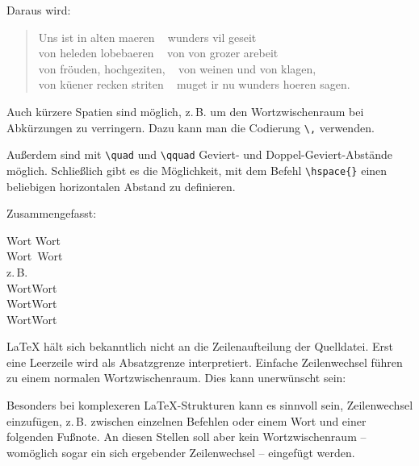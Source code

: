 Daraus wird:

\begin{lfgwprint}{}
 \begin{verse}
 Uns ist in alten maeren ~ wunders vil geseit\\
 von heleden lobebaeren ~ von von grozer arebeit\\
 von fröuden, hochgeziten, ~ von weinen und von klagen,\\
 von küener recken striten ~ muget ir nu wunders hoeren sagen.
 \end{verse}
\end{lfgwprint}

Auch kürzere Spatien sind möglich, z.\,B. um den Wortzwischenraum bei Abkürzungen zu verringern.
Dazu kann man die Codierung \lstinline/\,/ verwenden.

Außerdem sind mit \lstinline/\quad/ und \lstinline/\qquad/ Geviert- und Doppel-Geviert-Abstände
möglich.
Schließlich gibt es die Möglichkeit, mit dem Befehl \lstinline/\hspace{}/ einen beliebigen
horizontalen Abstand zu definieren.

Zusammengefasst:

\begin{lfgwexample}{}
Wort Wort\\       %
Wort~Wort\\       %
z.\,B.\\          %
Wort\quad Wort\\  %
Wort\qquad Wort\\ %
Wort\hspace{20mm}Wort\\ %
\end{lfgwexample}    



\LaTeX{} hält sich bekanntlich nicht an die Zeilenaufteilung der Quelldatei. Erst eine Leerzeile
wird als Absatzgrenze interpretiert. Einfache Zeilenwechsel führen zu einem normalen 
Wortzwischenraum. Dies kann unerwünscht sein:

Besonders bei komplexeren \LaTeX -Strukturen kann es sinnvoll sein, Zeilenwechsel einzufügen,
z.\,B. zwischen einzelnen Befehlen oder einem Wort und einer folgenden Fußnote.
An diesen Stellen soll aber kein Wortzwischenraum -- womöglich sogar ein sich ergebender 
Zeilenwechsel -- eingefügt werden.

